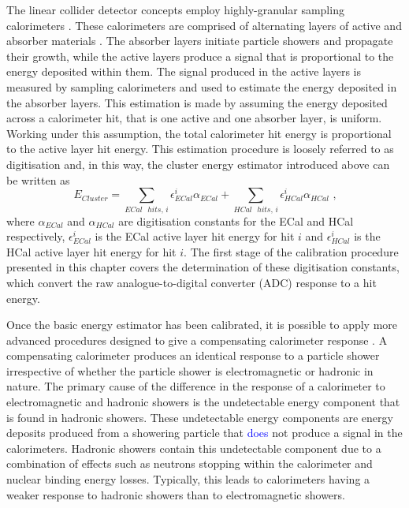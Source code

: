 The linear collider detector concepts employ highly-granular sampling calorimeters \cite{Behnke:2013lya,Linssen:2012hp}.  These calorimeters are comprised of alternating layers of active and absorber materials \cite{Fabjan:2003aq}.  The absorber layers initiate particle showers and propagate their growth, while the active layers produce a signal that is proportional to the energy deposited within them.  The signal produced in the active layers is measured by sampling calorimeters and used to estimate the energy deposited in the absorber layers.  This estimation is made by assuming the energy deposited across a calorimeter hit, that is one active and one absorber layer, is uniform.  Working under this assumption, the total calorimeter hit energy is proportional to the active layer hit energy.  This estimation procedure is loosely referred to as digitisation and, in this way, the cluster energy estimator introduced above can be written as
%
\begin{equation}
E_{Cluster} = \sum_{ECal \text{ } hits \text{, }i} \epsilon^{i}_{ECal} \alpha_{ECal} + \sum_{HCal \text{ } hits \text{, }i} \epsilon^{i}_{HCal} \alpha_{HCal} \text{ ,}
\end{equation}
%
\noindent where $\alpha_{ECal}$ and $\alpha_{HCal}$ are digitisation constants for the ECal and HCal respectively, $\epsilon^{i}_{ECal}$ is the ECal active layer hit energy for hit $i$ and $\epsilon^{i}_{HCal}$ is the HCal active layer hit energy for hit $i$.  The first stage of the calibration procedure presented in this chapter covers the determination of these digitisation constants, which convert the raw analogue-to-digital converter (ADC) response to a hit energy.

Once the basic energy estimator has been calibrated, it is possible to apply more advanced procedures designed to give a compensating calorimeter response \cite{arXiv:0907.3577}.  A compensating calorimeter produces an identical response to a particle shower irrespective of whether the particle shower is electromagnetic or hadronic in nature.  The primary cause of the difference in the response of a calorimeter to electromagnetic and hadronic showers is the undetectable energy component that is found in hadronic showers.  These undetectable energy components are energy deposits produced from a showering particle that \textcolor{blue}{does} not produce a signal in the calorimeters.  Hadronic showers contain this undetectable component due to a combination of effects such as neutrons stopping within the calorimeter and nuclear binding energy losses.  Typically, this leads to calorimeters having a weaker response to hadronic showers than to electromagnetic showers.  

